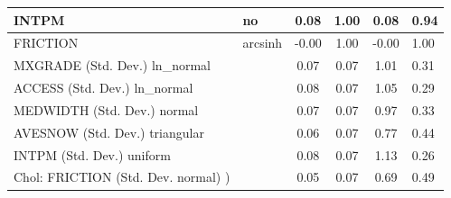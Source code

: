 \begin{table}
\begin{center}
\begin{tabular}{|l|l|c|c|c|l|}
			\hline
			INTPM & no & 0.08 & 1.00 & 0.08 & 0.94 \\
			\hline
			FRICTION & arcsinh & -0.00 & 1.00 & -0.00 & 1.00 \\
			\hline
			MXGRADE (Std. Dev.) ln_normal &  & 0.07 & 0.07 & 1.01 & 0.31 \\
			\hline
			ACCESS (Std. Dev.) ln_normal &  & 0.08 & 0.07 & 1.05 & 0.29 \\
			\hline
			MEDWIDTH (Std. Dev.) normal &  & 0.07 & 0.07 & 0.97 & 0.33 \\
			\hline
			AVESNOW (Std. Dev.) triangular &  & 0.06 & 0.07 & 0.77 & 0.44 \\
			\hline
			INTPM (Std. Dev.) uniform &  & 0.08 & 0.07 & 1.13 & 0.26 \\
			\hline
			 Chol: FRICTION (Std. Dev. normal) ) &  & 0.05 & 0.07 & 0.69 & 0.49 \\
			\hline
		\end{tabular}
	\end{center}
\end{table}